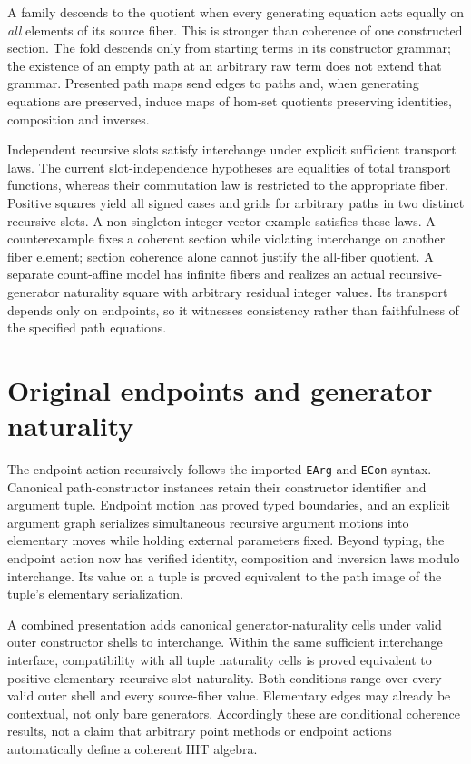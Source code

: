 \documentclass[11pt,a4paper]{article}
\begin{document}
A family descends to the quotient when every generating equation acts equally
on \emph{all} elements of its source fiber. This is stronger than coherence
of one constructed section. The fold descends only from starting terms in
its constructor grammar; the existence of an empty path at an arbitrary raw
term does not extend that grammar. Presented path maps send edges to paths
and, when generating equations are preserved, induce maps of hom-set
quotients preserving identities, composition and inverses.

Independent recursive slots satisfy interchange under explicit sufficient
transport laws. The current slot-independence hypotheses are equalities of
total transport functions, whereas their commutation law is restricted to
the appropriate fiber. Positive squares yield all signed cases and grids
for arbitrary paths in two distinct recursive slots. A non-singleton
integer-vector example satisfies these laws. A counterexample fixes a
coherent section while violating interchange on another fiber element;
section coherence alone cannot justify the all-fiber quotient.
A separate count-affine model has infinite fibers and realizes an actual
recursive-generator naturality square with arbitrary residual integer values.
Its transport depends only on endpoints, so it witnesses consistency rather
than faithfulness of the specified path equations.

\section{Original endpoints and generator naturality}
The endpoint action recursively follows the imported \texttt{EArg} and
\texttt{ECon} syntax. Canonical path-constructor instances retain their
constructor identifier and argument tuple. Endpoint motion has proved typed
boundaries, and an explicit argument graph serializes simultaneous recursive
argument motions into elementary moves while holding external parameters
fixed. Beyond typing, the endpoint action now has verified identity,
composition and inversion laws modulo interchange. Its value on a tuple is
proved equivalent to the path image of the tuple's elementary serialization.

A combined presentation adds canonical generator-naturality cells under
valid outer constructor shells to interchange. Within the same sufficient
interchange interface, compatibility with all tuple naturality cells is
proved equivalent to positive elementary recursive-slot naturality. Both
conditions range over every valid outer shell and every source-fiber value.
Elementary edges may already be contextual, not only bare generators.
Accordingly these are conditional coherence results, not a claim that
arbitrary point methods or endpoint actions automatically define a coherent
HIT algebra.
\end{document}
